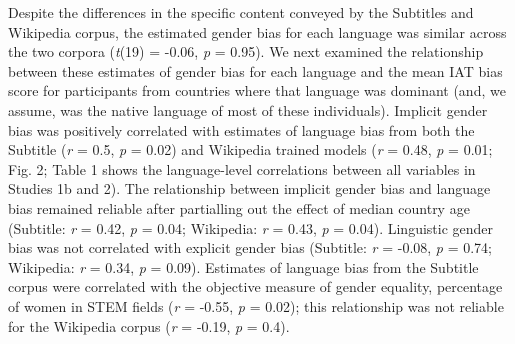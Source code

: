 \documentclass[man,floatsintext]{apa6}
\begin{document}
Despite the differences in the specific content conveyed by the Subtitles and Wikipedia corpus, the estimated gender bias for each language was similar across the two corpora (\emph{t}(19) = -0.06, \emph{p} = 0.95). We next examined the relationship between these estimates of gender bias for each language and the mean IAT bias score for participants from countries where that language was dominant (and, we assume, was the native language of most of these individuals). Implicit gender bias was positively correlated with estimates of language bias from both the Subtitle (\emph{r} = 0.5, \emph{p} = 0.02) and Wikipedia trained models (\emph{r} = 0.48, \emph{p} = 0.01; Fig. 2; Table 1 shows the language-level correlations between all variables in Studies 1b and 2). The relationship between implicit gender bias and language bias remained reliable after partialling out the effect of median country age (Subtitle: \emph{r} = 0.42, \emph{p} = 0.04; Wikipedia: \emph{r} = 0.43, \emph{p} = 0.04). Linguistic gender bias was not correlated with explicit gender bias (Subtitle: \emph{r} = -0.08, \emph{p} = 0.74; Wikipedia: \emph{r} = 0.34, \emph{p} = 0.09). Estimates of language bias from the Subtitle corpus were correlated with the objective measure of gender equality, percentage of women in STEM fields (\emph{r} = -0.55, \emph{p} = 0.02); this relationship was not reliable for the Wikipedia corpus (\emph{r} = -0.19, \emph{p} = 0.4).

\begingroup\fontsize{6}{8}\selectfont
\end{document}
